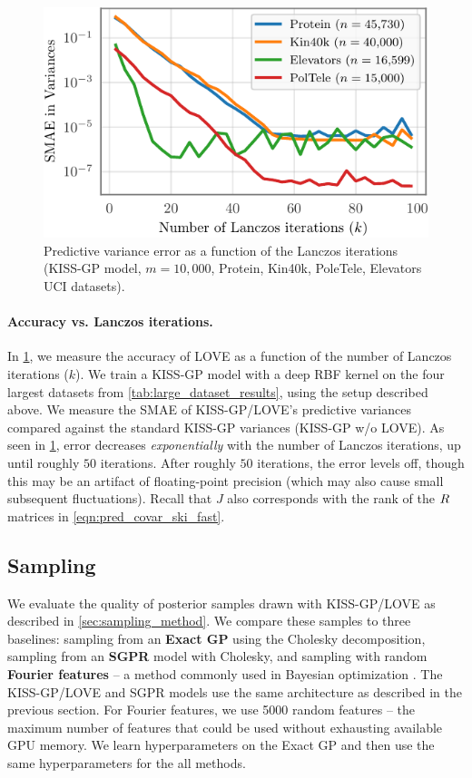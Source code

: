 \begin{figure}[t!]
  \centering
  \includegraphics[width=0.95\columnwidth]{figures/lanczos_accuracy.pdf}
  \vspace{-2ex}
  \caption{
    Predictive variance error as a function of the Lanczos iterations (KISS-GP model, $m=10,\!000$, Protein, Kin40k, PoleTele, Elevators  UCI datasets).
    \label{fig:lanczos_accuracy}
  }
  \vspace{-1ex}
\end{figure}

\paragraph{Accuracy vs. Lanczos iterations.}
In \cref{fig:lanczos_accuracy}, we measure the accuracy of LOVE{} as a function of the number of Lanczos iterations ($k$).
We train a KISS-GP model with a deep RBF kernel on the four largest datasets from \cref{tab:large_dataset_results}, using the setup described above.
We measure the SMAE of KISS-GP/LOVE's predictive variances compared against the standard KISS-GP variances (KISS-GP w/o LOVE).
As seen in \cref{fig:lanczos_accuracy}, error decreases \emph{exponentially} with the number of Lanczos iterations, up until roughly $50$ iterations.
After roughly $50$ iterations, the error levels off, though this may be an artifact of floating-point precision (which may also cause small subsequent fluctuations).
Recall that $J$ also corresponds with the rank of the $R$ matrices in \cref{eqn:pred_covar_ski_fast}.

\subsection{Sampling}

We evaluate the quality of posterior samples drawn with KISS-GP/LOVE{} as described in \cref{sec:sampling_method}.
We compare these samples to three baselines: sampling from an {\bf Exact GP} using the Cholesky decomposition, sampling from an {\bf SGPR} model with Cholesky, and sampling with random {\bf Fourier features} \citep{rahimi2008random} -- a method commonly used in Bayesian optimization \cite{hernandez2014predictive,wang2017max}.
The KISS-GP/LOVE{} and SGPR models use the same architecture as described in the previous section.
For Fourier features, we use 5000 random features -- the maximum number of features that could be used without exhausting available GPU memory.
We learn hyperparameters on the Exact GP and then use the same hyperparameters for the all methods.

